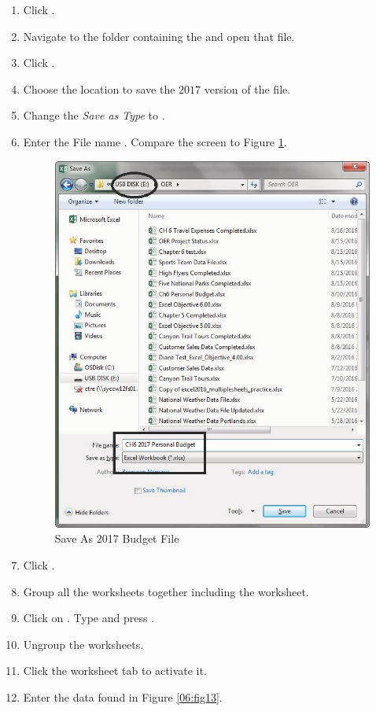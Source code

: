 \begin{enumbox}
	\begin{enumerate}
		\item Click .
		\item Navigate to the folder containing the  and open that file.
		\item Click .
		\item Choose the location to save the $ 2017 $ version of the file.
		\item Change the \textit{Save as Type} to .
		\item Enter the File name . Compare the screen to Figure \ref{06:fig12}.
	
		\begin{figure}[H]
			\centering
			\includegraphics[width=\maxwidth{.95\linewidth}]{gfx/ch06_fig12}
			\caption{Save As 2017 Budget File}
			\label{06:fig12}
		\end{figure}

		\item Click .
		\item Group all the worksheets together including the  worksheet.
		\item Click on . Type  and press .
		\item Ungroup the worksheets.
		\item Click the  worksheet tab to activate it. 
		\item Enter the data found in Figure \ref{06:fig13}.
	

\end{enumerate}
\end{enumbox}
